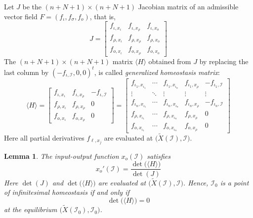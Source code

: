 \documentclass[pdflatex,sn-basic,Numbered]{sn-jnl}
\theoremstyle{thmstyleone}%
\newtheorem{lemma}[theorem]{Lemma}
\numberwithin{equation}{section}
\begin{document}
Let $J$ be the $(n+N+1)\times (n+N+1)$ Jacobian matrix of an admissible vector field $F=(f_{\iota},f_{\sigma},f_{o})$, that is,
\begin{equation} \label{jacobian}
J = \begin{bmatrix}
  f_{\iota, x_\iota}   &  f_{\iota, x_\rho} & f_{\iota, x_o} \\
  f_{\rho, x_\iota}   &  f_{\rho, x_\rho} & f_{\rho, x_o} \\
  f_{o, x_\iota} &  f_{o, x_\rho} & f_{o, x_o} 
\end{bmatrix}
\end{equation}
The $(n+N+1)\times (n+N+1)$ matrix $\langle H \rangle$ obtained from $J$ by replacing the last column by $(-f_{\iota,\mathcal{I}},0,0)^t$, is called \emph{generalized homeostasis matrix}:
\begin{equation} \label{weighted_homeostasis_matrix_definition}
\langle H \rangle = 
\begin{bmatrix}
f_{\iota, x_\iota} &  f_{\iota, x_\rho} & -f_{\iota, \mathcal{I}} \\
f_{\rho, x_\iota}&  f_{\rho, x_\rho} & 0 \\
f_{o, x_\iota} &  f_{o, x_\rho} & 0
\end{bmatrix} = \begin{bmatrix} f_{\iota_{1}, x_{\iota_{1}}} & \cdots & f_{\iota_{1}, x_{\iota_{n}}} & f_{\iota_{1}, x_{\rho}} & - f_{\iota_{1}, \mathcal{I}} \\
    \vdots & \ddots & \vdots & \vdots & \vdots \\
    f_{\iota_{n}, x_{\iota_{1}}} & \cdots & f_{\iota_{n}, x_{\iota_{n}}} & f_{\iota_{n}, x_{\rho}} & - f_{\iota_{n}, \mathcal{I}} \\
    f_{\rho, x_{\iota_{1}}} & \cdots & f_{\rho, x_{\iota_{n}}} & f_{\rho, x_{\rho}} & 0 \\
    f_{o, x_{\iota_{1}}} & \cdots & f_{o, x_{\iota_{n}}} & f_{o, x_{\rho}} & 0
    \end{bmatrix}
\end{equation}
Here all partial derivatives $f_{\ell,x_j}$ are evaluated at $\big(\tilde{X}(\mathcal{I}),\mathcal{I}\big)$.

\begin{lemma} \label{cramer_rule}
The input-output function $x_o(\mathcal{I})$ satisfies
\begin{equation} \label{xo'_MI}
x_o'(\mathcal{I}) = \frac{\det\!\big(\langle H \rangle\big) }{\det(J)}
\end{equation}
Here $\det(J)$ and $\det\!\big(\langle H \rangle\big)$ are evaluated at $\big(\tilde{X}(\mathcal{I}),\mathcal{I}\big)$. Hence, $\mathcal{I}_0$ is a point of infinitesimal homeostasis if and only if
\begin{equation} \label{xo'_reduced_MI}
\det\!\big(\langle H \rangle\big) = 0
\end{equation}
at the equilibrium $\big(\tilde{X}(\mathcal{I}_0),\mathcal{I}_0\big)$.
\end{lemma}
\end{document}
